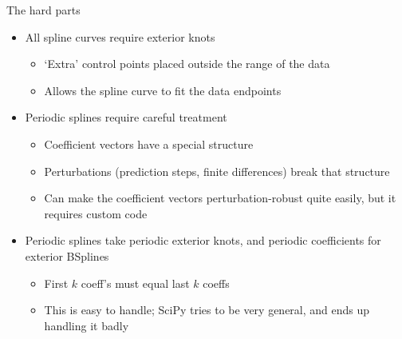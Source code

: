 \documentclass[presentation]{beamer}
\begin{document}
\begin{frame}[label={sec:org05f48f0}]{The hard parts}
\begin{itemize}
\item All spline curves require exterior knots
\begin{itemize}
\item `Extra' control points placed outside the range of the data
\item Allows the spline curve to fit the data endpoints
\end{itemize}
\end{itemize}
\vfill
\begin{itemize}
\item Periodic splines require careful treatment
\begin{itemize}
\item Coefficient vectors have a special structure
\item Perturbations (prediction steps, finite differences) break that structure
\item Can make the coefficient vectors perturbation-robust quite easily, but it requires custom code
\end{itemize}
\end{itemize}
\vfill
\begin{itemize}
\item Periodic splines take periodic exterior knots, and periodic coefficients for exterior BSplines
\begin{itemize}
\item First \(k\) coeff's must equal last \(k\) coeffs
\item This is easy to handle; SciPy tries to be very general, and ends up handling it badly
\end{itemize}
\end{itemize}
\end{frame}
\end{document}
